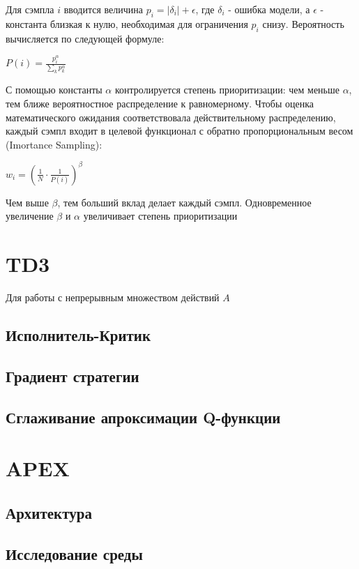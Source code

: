 \documentclass{mipt-thesis-bs}
\begin{document}
Для сэмпла $i$ вводится величина $p_i=|\delta_i| + \epsilon$, где $\delta_i$ - ошибка модели, а $\epsilon$ - константа близкая к нулю, необходимая для ограничения $p_i$ снизу. Вероятность вычисляется по следующей формуле:

\begin{center}
    $P(i)=\frac{p_{i}^{\alpha}}{\sum_{k} p_{k}^{\alpha}}$
\end{center}

С помощью константы $\alpha$ контролируется степень приоритизации: чем меньше $\alpha$, тем ближе вероятностное распределение к равномерному. Чтобы оценка математического ожидания соответствовала действительному распределению, каждый сэмпл входит в целевой функционал с обратно пропорциональным весом (Imortance Sampling):

\begin{center}
$w_{i}=\left(\frac{1}{N} \cdot \frac{1}{P(i)}\right)^{\beta}$    
\end{center}

Чем выше $\beta$, тем больший вклад делает каждый сэмпл. Одновременное увеличение $\beta$ и $\alpha$ увеличивает степень приоритизации



 \chapter{TD3}
 
Для работы с непрерывным множеством действий $A$                         
\section{Исполнитель-Критик}
\section{Градиент стратегии}
\section{Сглаживание апроксимации Q-функции}


\chapter{APEX}
\section{Архитектура}
\section{Исследование среды}
\end{document}
